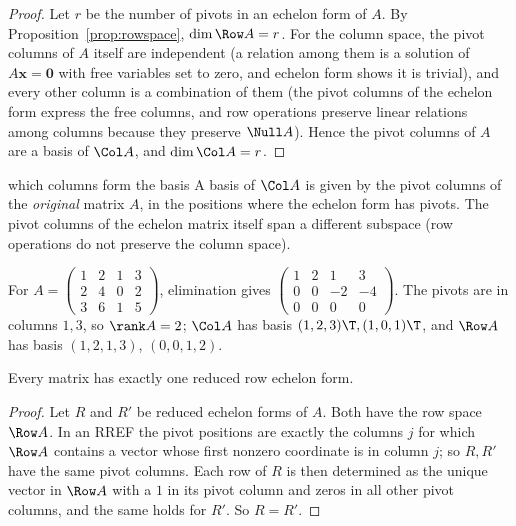 \begin{proof}
Let $r$ be the number of pivots in an echelon form of $A$. By Proposition~\ref{prop:rowspace}, $\dim\Row A=r$. For the column space, the pivot columns of $A$ itself are independent (a relation among them is a solution of $A\mathbf{x}=\mathbf{0}$ with free variables set to zero, and echelon form shows it is trivial), and every other column is a combination of them (the pivot columns of the echelon form express the free columns, and row operations preserve linear relations among columns because they preserve $\Null A$). Hence the pivot columns of $A$ are a basis of $\Col A$, and $\dim\Col A=r$.
\end{proof}

\begin{nuance}{which columns form the basis}
A basis of $\Col A$ is given by the pivot columns of the \emph{original} matrix $A$, in the positions where the echelon form has pivots. The pivot columns of the echelon matrix itself span a different subspace (row operations do not preserve the column space).
\end{nuance}

\begin{example}
For $A=\begin{pmatrix}1&2&1&3\\2&4&0&2\\3&6&1&5\end{pmatrix}$, elimination gives $\begin{pmatrix}1&2&1&3\\0&0&-2&-4\\0&0&0&0\end{pmatrix}$. The pivots are in columns $1,3$, so $\rank A=2$; $\Col A$ has basis $(1,2,3)\T,(1,0,1)\T$, and $\Row A$ has basis $(1,2,1,3)$, $(0,0,1,2)$.
\end{example}

\begin{corollary}\label{cor:rrefunique}
Every matrix has exactly one reduced row echelon form.
\end{corollary}

\begin{proof}
Let $R$ and $R'$ be reduced echelon forms of $A$. Both have the row space $\Row A$. In an RREF the pivot positions are exactly the columns $j$ for which $\Row A$ contains a vector whose first nonzero coordinate is in column $j$; so $R,R'$ have the same pivot columns. Each row of $R$ is then determined as the unique vector in $\Row A$ with a $1$ in its pivot column and zeros in all other pivot columns, and the same holds for $R'$. So $R=R'$.
\end{proof}

